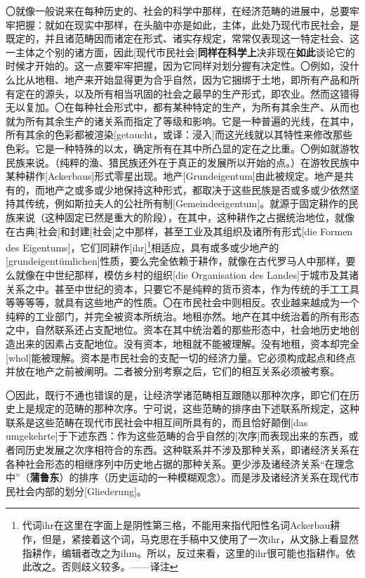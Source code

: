 \documentclass[a4paper,twoside,12pt]{ctexart}
\begin{document}
〇就像一般说来在每种历史的、社会的科学中那样，在经济范畴的进展中，总要牢牢把握：就如在现实中那样，在头脑中亦是如此，主体，此处乃现代市民社会，是既定的，并且诸范畴因而诸定在形式、诸实存规定，常常仅表现这一特定社会、这一主体之个别的诸方面，因此[现代市民社会]\textbf{同样在科学上}决非现在\textbf{如此}谈论它的时候才开始的。这一点要牢牢把握，因为它同样对划分握有决定性。〇例如，没什么比从地租、地产来开始显得更为合乎自然，因为它捆绑于土地，即所有产品和所有定在的源头，以及所有相当巩固的社会之最早的生产形式，即农业。然而这错得无以复加。〇在每种社会形式中，都有某种特定的生产，为所有其余生产、从而也就为所有其余生产的诸关系而指定了等级和影响。它是一种普遍的光线，在其中，所有其余的色彩都被渲染[getaucht，或译：浸入]而这光线就以其特性来修改那些色彩。它是一种特殊的以太，确定所有在其中所凸显的定在之比重。〇例如就游牧民族来说。（纯粹的渔、猎民族还外在于真正的发展所以开始的点。）在游牧民族中某种耕作[Ackerbaus]形式零星出现。地产[Grundeigentum]由此被规定。地产是共有的，而地产之或多或少地保持这种形式，都取决于这些民族是否或多或少依然坚持其传统，例如斯拉夫人的公社所有制[Gemeindeeigentum]。就源于固定耕作的民族来说（这种固定已然是重大的阶段），在其中，这种耕作之占据统治地位，就像在古典[社会]和封建[社会]之中那样，甚至工业及其组织及诸所有形式[die Formen des Eigentums]，它们同耕作[ihr]\footnote{代词ihr在这里在字面上是阴性第三格，不能用来指代阳性名词Ackerbau耕作，但是，紧接着这个词，马克思在手稿中又使用了一次ihr，从文脉上看显然指耕作，编辑者改之为ihm。所以，反过来看，这里的ihr很可能也指耕作。依此改之。否则歧义较多。——译注}相适应，具有或多或少地产的[grundeigentümlichen]性质，要么完全依赖于耕作，就像在古代罗马人中那样，要么就像在中世纪那样，模仿乡村的组织[die Organisation des Landes]于城市及其诸关系之中。甚至中世纪的资本，只要它不是纯粹的货币资本，作为传统的手工工具等等等等，就具有这些地产的性质。〇在市民社会中则相反。农业越来越成为一个纯粹的工业部门，并完全被资本所统治。地租亦然。地产在其中统治着的所有形态之中，自然联系还占支配地位。资本在其中统治着的那些形态中，社会地历史地创造出来的因素占支配地位。没有资本，地租就不能被理解。没有地租，资本却完全[whol]能被理解。资本是市民社会的支配一切的经济力量。它必须构成起点和终点并放在地产之前被阐明。二者被分别考察之后，它们的相互关系必须被考察。

〇因此，既行不通也错误的是，让经济学诸范畴相互跟随以那种次序，即它们在历史上是规定的范畴的那种次序。宁可说，这些范畴的排序由下述联系所规定，这种联系是这些范畴在现代市民社会中相互间所具有的，而且恰好颠倒[das umgekehrte]于下述东西：作为这些范畴的合乎自然的[次序]而表现出来的东西，或者同历史发展之次序相符合的东西。这种联系并不涉及那种关系，即诸经济关系在各种社会形态的相继序列中历史地占据的那种关系。更少涉及诸经济关系“在理念中”（\textbf{蒲鲁东}）的排序（历史运动的一种模糊观念）。而是涉及诸经济关系在现代市民社会内部的划分[Gliederung]。
\end{document}
